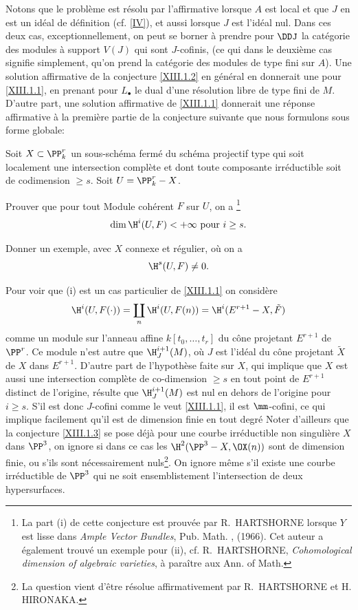 Notons que le probl\`eme est r\'esolu par l'affirmative lorsque $A$ est local et que $J$ en est un id\'eal de d\'efinition (cf. \Exp \ref{IV}), et aussi lorsque $J$ est l'id\'eal nul. Dans ces deux cas, exceptionnellement, on peut se borner \`a prendre pour ${\DDJ}$ la cat\'egorie des modules \`a support $V(J)$ qui sont $J$-cofinis, (ce qui dans le deuxi\`eme cas signifie simplement, qu'on prend la cat\'egorie des modules de type fini sur $A$). Une solution affirmative de la conjecture \ref{XIII.1.2} en g\'en\'eral en donnerait une pour \ref{XIII.1.1}, en prenant pour $L_{\bullet}$ le dual d'une r\'esolution libre de type fini de $M$. D'autre part, une solution affirmative de \ref{XIII.1.1} donnerait une r\'eponse affirmative \`a la premi\`ere partie de la conjecture suivante que nous formulons sous forme \og globale\fg:

\begin{conjecture} \label{XIII.1.3}
Soit $X\subset \PP^r_k$ un sous-sch\'ema ferm\'e du sch\'ema projectif type qui soit localement une intersection compl\`ete et dont toute composante irr\'eductible soit de codimension $\ge s$. Soit $U=\PP^r_k -X$.
\begin{enumeratei}
\item
Prouver que pour tout Module coh\'erent $F$ sur $U$, on a
\footnote{La part (i) de cette conjecture est prouv\'ee par R.~HARTSHORNE lorsque $Y$ est lisse dans \emph{Ample Vector Bundles}, Pub. Math. , (1966). Cet auteur a \'egalement trouv\'e un exemple pour (ii), cf. R.~HARTSHORNE, \emph{Cohomological dimension of algebraic varieties}, \`a para\^itre aux Ann. of Math.}$$
\dim \H^i(U, F)<+\infty{\rm \ pour\ } i\ge s.{}
$$

\item
Donner un exemple, avec $X$ connexe et r\'egulier, o\`u on a
$$
\H^s(U, F)\neq 0.
$$
\end{enumeratei}
\end{conjecture}

Pour voir que (i) est un cas particulier de \ref{XIII.1.1} on consid\`ere
$$
\H^i(U, F(\cdot))=\coprod_n \H^i (U, F(n))= \H^i(E^{r+1} -X, \tilde{F})$$
comme un module sur l'anneau affine $k[t_0, \ldots, t_r]$ du c\^{o}ne projetant $E^{r+1}$ de $\PP^r$. Ce module n'est autre que $\H_J^{i+1}(M)$, o\`u $J$ est l'id\'eal du c\^{o}ne projetant $\tilde X$ de $X$ dans $E^{r+1}$. D'autre part de l'hypoth\`ese faite sur $X$, qui implique que $X$ est aussi une intersection compl\`ete de co-dimension $\ge s$ en tout point de $E^{r+1}$ distinct de l'origine, r\'esulte que $\H^{i+1}_J(M)$ est nul en dehors de l'origine pour $i\ge s$. S'il est donc $J$-cofini comme le veut \ref{XIII.1.1}, il est \afortiori $\mm$-cofini, ce qui implique facilement qu'il est de dimension finie en tout degr\'e Noter d'ailleurs que la conjecture \ref{XIII.1.3} se pose d\'ej\`a pour une courbe irr\'eductible non singuli\`ere $X$ dans $\PP^3$, on ignore si dans ce cas les $\H^2(\PP^3-X, \OX(n))$ sont de dimension finie, ou s'ils sont n\'ecessairement nuls\footnote{La question vient d'\^etre r\'esolue affirmativement par R.\, HARTSHORNE et H. HIRONAKA.}. On ignore m\^eme s'il existe une courbe irr\'eductible de $\PP^3$ qui ne soit ensemblistement l'intersection de deux hypersurfaces\label{courbesurface}.

